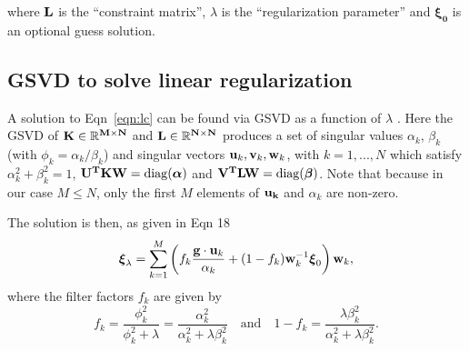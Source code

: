 \documentclass[12pt,a4paper]{article}
\begin{document}
where ${\bf L}$ is the ``constraint matrix'', $\lambda$ is the ``regularization parameter'' and $\boldsymbol{\xi_0}$ is an optional guess solution. 

\vspace{-10pt}
\subsection*{GSVD to solve linear regularization}

A solution to Eqn~\ref{eqn:lc} can be found via GSVD as a function of $\lambda$ \citep{1992InvPr...8..849H}. Here the GSVD of $\bf{K}\in \mathbb{R}^{M\times N}$ and $\bf{L}\in \mathbb{R}^{N\times N}$ produces a set of singular values $\alpha_k$, $\beta_k$ (with $\phi_k=\alpha_k/\beta_k$) and singular vectors
${\bf u}_k, {\bf v}_k, {\bf w}_k$, with $k=1,...,N$ which satisfy $\alpha_k^2 +
\beta_k^2=1$, ${\bf U^T {K}W}=\mathrm{diag}(\boldsymbol{\alpha})$ and ${\bf V^T
LW}=\mathrm{diag}(\boldsymbol{\beta})$. Note that because in our case $M \leq N$, only the first $M$ elements of ${\bf u_k}$ and $\alpha_k$ are non-zero. 

The solution is then, as given in \citet{1992InvPr...8..849H} Eqn 18
\begin{equation}\label{eqn:sol}
\boldsymbol{\xi}_\lambda =\sum_{k=1}^ M\left(f_k\frac{{\bf g}\cdot {\bf u}_k}{\alpha_k}
 +(1-f_k) {\bf w}_k^{-1}\boldsymbol{\xi}_0 \right) {\bf w}_k,
\end{equation}
where the filter factors $f_k$ are given by
\begin{equation}
f_k=\frac{\phi_k^2}{\phi_k^2 +\lambda}=\frac{\alpha_k^2}{\alpha_k^2+\lambda\beta_k^2}\quad\mathrm{and}\quad
1-f_k=\frac{\lambda\beta_k^2}{\alpha_k^2+\lambda\beta_k^2}.
\end{equation}

\end{document}
